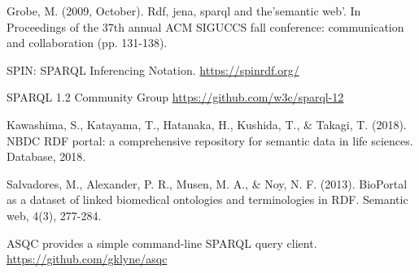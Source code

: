 \documentclass[runningheads]{llncs}
\begin{document}
\begin{thebibliography}{8}
Grobe, M. (2009, October). Rdf, jena, sparql and the'semantic web'. In Proceedings of the 37th annual ACM SIGUCCS fall conference: communication and collaboration (pp. 131-138).

SPIN: SPARQL Inferencing Notation.
\url{https://spinrdf.org/}

SPARQL 1.2 Community Group
\url{https://github.com/w3c/sparql-12}

Kawashima, S., Katayama, T., Hatanaka, H., Kushida, T., & Takagi, T. (2018). NBDC RDF portal: a comprehensive repository for semantic data in life sciences. Database, 2018.

Salvadores, M., Alexander, P. R., Musen, M. A., & Noy, N. F. (2013). BioPortal as a dataset of linked biomedical ontologies and terminologies in RDF. Semantic web, 4(3), 277-284.

ASQC provides a simple command-line SPARQL query client.
\url{https://github.com/gklyne/asqc}





\end{thebibliography}
\end{document}
